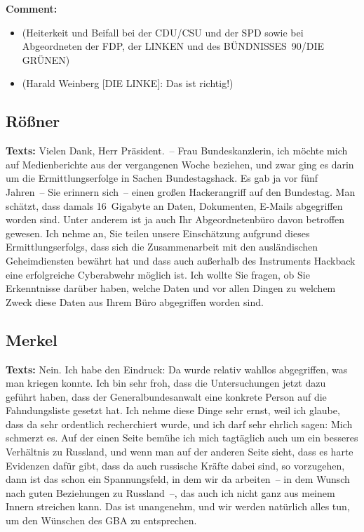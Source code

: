 \documentclass{article}
\begin{document}
\noindent\textbf{Comment:}
\begin{itemize}
    \setlength\itemsep{-3pt}
    \item (Heiterkeit und Beifall bei der CDU/CSU und der SPD sowie bei Abgeordneten der FDP, der LINKEN und des BÜNDNISSES 90/DIE GRÜNEN)
    \setlength\itemsep{-3pt}
    \item (Harald Weinberg [DIE LINKE]: Das ist richtig!)
\end{itemize}
\subsection{Rößner}
\noindent\textbf{Texts:} Vielen Dank, Herr Präsident. – Frau Bundeskanzlerin, ich möchte mich auf Medienberichte aus der vergangenen Woche beziehen, und zwar ging es darin um die Ermittlungserfolge in Sachen Bundestagshack. Es gab ja vor fünf Jahren – Sie erinnern sich – einen großen Hackerangriff auf den Bundestag. Man schätzt, dass damals 16 Gigabyte an Daten, Dokumenten, E-Mails abgegriffen worden sind. Unter anderem ist ja auch Ihr Abgeordnetenbüro davon betroffen gewesen. Ich nehme an, Sie teilen unsere Einschätzung aufgrund dieses Ermittlungserfolgs, dass sich die Zusammenarbeit mit den ausländischen Geheimdiensten bewährt hat und dass auch außerhalb des Instruments Hackback eine erfolgreiche Cyberabwehr möglich ist. Ich wollte Sie fragen, ob Sie Erkenntnisse darüber haben, welche Daten und vor allen Dingen zu welchem Zweck diese Daten aus Ihrem Büro abgegriffen worden sind.

\subsection{Merkel}
\noindent\textbf{Texts:} Nein. Ich habe den Eindruck: Da wurde relativ wahllos abgegriffen, was man kriegen konnte. Ich bin sehr froh, dass die Untersuchungen jetzt dazu geführt haben, dass der Generalbundesanwalt eine konkrete Person auf die Fahndungsliste gesetzt hat. Ich nehme diese Dinge sehr ernst, weil ich glaube, dass da sehr ordentlich recherchiert wurde, und ich darf sehr ehrlich sagen: Mich schmerzt es. Auf der einen Seite bemühe ich mich tagtäglich auch um ein besseres Verhältnis zu Russland, und wenn man auf der anderen Seite sieht, dass es harte Evidenzen dafür gibt, dass da auch russische Kräfte dabei sind, so vorzugehen, dann ist das schon ein Spannungsfeld, in dem wir da arbeiten – in dem Wunsch nach guten Beziehungen zu Russland –, das auch ich nicht ganz aus meinem Innern streichen kann. Das ist unangenehm, und wir werden natürlich alles tun, um den Wünschen des GBA zu entsprechen.
\end{document}
